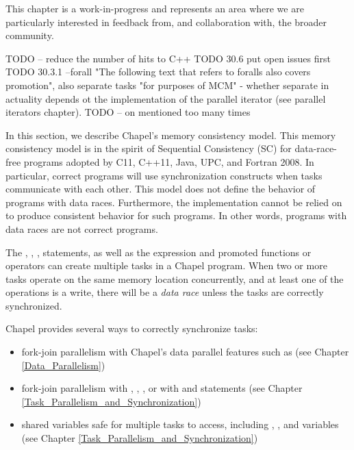 \label{Memory_Consistency_Model}

\begin{openissue}
  This chapter is a work-in-progress and represents an area where we
  are particularly interested in feedback from, and collaboration
  with, the broader community.
\end{openissue}

TODO -- reduce the number of hits to C++
TODO 30.6 put open issues first
TODO 30.3.1 --forall "The following text that refers to foralls also
covers promotion", also separate tasks "for purposes of MCM" - whether
separate in actuality depends ot the implementation of the parallel
iterator (see parallel iterators chapter).
TODO -- on mentioned too many times

In this section, we describe Chapel's memory consistency model. This memory
consistency model is in the spirit of Sequential Consistency (SC) for
data-race-free programs adopted by C11, C++11, Java, UPC, and Fortran 2008. In
particular, correct programs will use synchronization constructs when tasks
communicate with each other. This model does not define the behavior of
programs with
data races. Furthermore, the implementation cannot be relied on to produce
consistent behavior for such programs. In other words, programs with data
races are not correct programs.

The , , , 
statements, as well as
the  expression and promoted functions or operators can
create multiple tasks in a Chapel program. When two or more tasks operate on
the same memory location concurrently, and at least one of the operations is a
write, there will be a \textit{data race} unless the tasks are correctly
synchronized.

Chapel provides several ways to correctly synchronize tasks:

\begin{itemize}

  \item fork-join parallelism with Chapel's data parallel features such as
   (see Chapter \ref{Data_Parallelism})

  \item fork-join parallelism with , ,
  , or with  and  statements (see
  Chapter \ref{Task_Parallelism_and_Synchronization})


  \item shared variables safe for multiple tasks to access, including
  , , and  variables (see Chapter
  \ref{Task_Parallelism_and_Synchronization})

\end{itemize}

